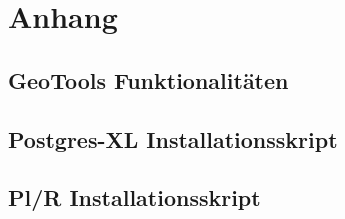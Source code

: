 







\frontmatter												%


\tableofcontents										%

\printglossary[title=Glossar] 			%
\printglossary[type=\acronymtype,title=Abk\"urzungsverzeichnis]	%

\listoffigures											%
\listoftables												%

\mainmatter													%


\appendix
\chapter{Anhang}
%	
\section{GeoTools Funktionalitäten}
	
\section{Postgres-XL Installationsskript}
	
\section{Pl/R Installationsskript}

